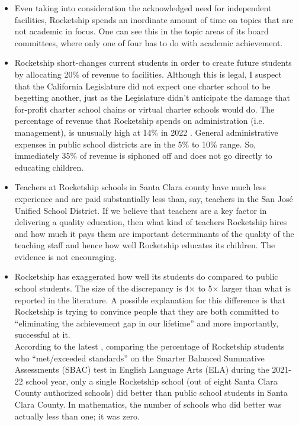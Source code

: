 \begin{enumerate}[topsep=0.3\baselineskip,itemsep=0.25\baselineskip,resume]
\begin{itemize}[topsep=0.125\baselineskip,itemsep=0.25\baselineskip]
    \item Even taking into consideration the acknowledged need for independent facilities, Rocketship spends an inordinate amount of time on topics that are not academic in focus. One can see this in the topic areas of its board committees, where only one of four has to do with academic achievement.
      \item Rocketship short-changes current students in order to create future students by allocating 20\% of revenue to facilities. Although this is legal, I suspect that the California Legislature did not expect one charter school to be begetting another, just as the Legislature didn't anticipate the damage that for-profit charter school chains or virtual charter schools would do.
      The percentage of revenue that Rocketship spends on administration (i.e. management), is unusually high at 14\% in 2022 \parencite[38]{RSEA2022}. General administrative expenses in public school districts are in the 5\% to 10\% range. So, immediately 35\% of revenue is siphoned off and does not go directly to educating children.
      \item Teachers at Rocketship schools in Santa Clara county have much less experience and are paid substantially less than, say, teachers in the San José Unified School District. If we believe that teachers are a key factor in delivering a quality education, then what kind of teachers Rocketship hires and how much it pays them are important determinants of the quality of the teaching staff and hence how well Rocketship educates its children. The evidence is not encouraging.
      \item Rocketship has exaggerated how well its students do compared to public school students. The size of the discrepancy is 4× to 5× larger than what is reported in the literature. A possible explanation for this difference is that Rocketship is trying to convince people that they are both committed to ``eliminating the achievement gap in our lifetime'' and more importantly, successful at it.\\
      According to the latest , comparing the percentage of Rocketship students who ``met/exceeded standards'' on the Smarter Balanced Summative Assessments (SBAC) test in English Language Arts (ELA) during the 2021-22 school year, only a single Rocketship school (out of eight Santa Clara County authorized schools) did better than public school students in Santa Clara County. In mathematics, the number of schools who did better was actually less than one; it was zero.\\

\end{itemize}
\end{enumerate}
